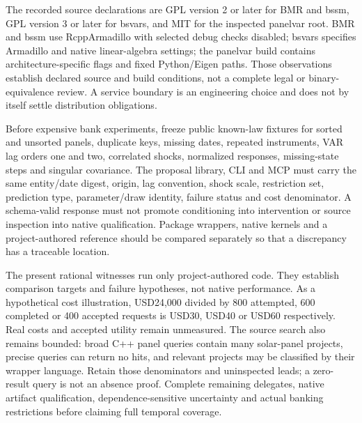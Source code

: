 The recorded source declarations are GPL version 2 or later for BMR and bssm, GPL version 3 or later for bsvars, and MIT for the inspected panelvar root. BMR and bssm use RcppArmadillo with selected debug checks disabled; bsvars specifies Armadillo and native linear-algebra settings; the panelvar build contains architecture-specific flags and fixed Python/Eigen paths. Those observations establish declared source and build conditions, not a complete legal or binary-equivalence review. A service boundary is an engineering choice and does not by itself settle distribution obligations.~\citep{exec25_cdyn_bmr,exec25_cdyn_bsvars,exec25_cdyn_bssm,exec25_cdyn_panelvar}

Before expensive bank experiments, freeze public known-law fixtures for sorted and unsorted panels, duplicate keys, missing dates, repeated instruments, VAR lag orders one and two, correlated shocks, normalized responses, missing-state steps and singular covariance. The proposal library, CLI and MCP must carry the same entity/date digest, origin, lag convention, shock scale, restriction set, prediction type, parameter/draw identity, failure status and cost denominator. A schema-valid response must not promote conditioning into intervention or source inspection into native qualification. Package wrappers, native kernels and a project-authored reference should be compared separately so that a discrepancy has a traceable location.~\citep{exec25_cdyn_choice}

The present rational witnesses run only project-authored code. They establish comparison targets and failure hypotheses, not native performance. As a hypothetical cost illustration, USD24,000 divided by 800 attempted, 600 completed or 400 accepted requests is USD30, USD40 or USD60 respectively. Real costs and accepted utility remain unmeasured. The source search also remains bounded: broad C++ panel queries contain many solar-panel projects, precise queries can return no hits, and relevant projects may be classified by their wrapper language. Retain those denominators and uninspected leads; a zero-result query is not an absence proof. Complete remaining delegates, native artifact qualification, dependence-sensitive uncertainty and actual banking restrictions before claiming full temporal coverage.~\citep{exec25_cdyn_choice}

